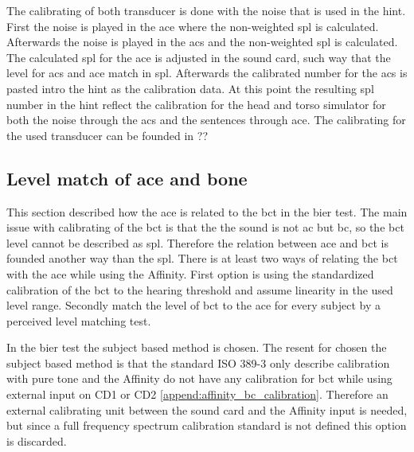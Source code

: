 The calibrating of both transducer is done with the noise that is used in the \gls{hint}. First the noise is played in the \gls{ace} where the non-weighted \gls{spl} is calculated. Afterwards the noise is played in the \gls{acs} and the non-weighted \gls{spl} is calculated. The calculated \gls{spl} for the \gls{ace} is adjusted in the sound card, such way that the level for \gls{acs} and \gls{ace} match in \gls{spl}. Afterwards the calibrated number for the \gls{acs} is pasted intro the \gls{hint} as the calibration data. At this point the resulting \gls{spl} number in the \gls{hint} reflect the calibration for the head and torso simulator for both the noise through the \gls{acs} and the sentences through \gls{ace}. The calibrating for the used transducer can be founded in ??%
   
\subsection{Level match of \gls{ace} and bone}
This section described how the \gls{ace} is related to the \gls{bct} in the \gls{bier} test. The main issue with calibrating of the \gls{bct} is that the the sound is not \gls{ac} but \gls{bc}, so the \gls{bct} level cannot be described as \gls{spl}. Therefore the relation between \gls{ace} and \gls{bct} is founded another way than the \gls{spl}. There is at least two ways of relating the \gls{bct} with the \gls{ace} while using the Affinity. First option is using the standardized calibration of the \gls{bct} to the hearing threshold and assume linearity in the used level range. Secondly match the level of \gls{bct} to the \gls{ace} for every subject by a perceived level matching test.

In the \gls{bier} test the subject based method is chosen. The resent for chosen the subject based method is that the standard ISO 389-3 \citep{iso_389-3} only describe calibration with pure tone and the Affinity do not have any calibration for \gls{bct} while using external input on CD1 or CD2 \autoref{append:affinity_bc_calibration}. Therefore an external calibrating unit between the sound card and the Affinity input is needed, but since a full frequency spectrum calibration standard is not defined this option is discarded.

